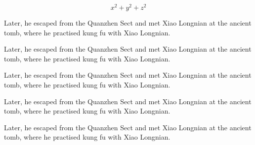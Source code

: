 \documentclass[doctor, vlined, ]{DissertUESTC}
\begin{document}
\begin{longtable}{p{2em} p{6em}}
	\end{longtable}
	

	\begin{equation}
		x^2 + y^2 + z^2
	\end{equation}
	


	\begin{Definition}[Name]
		Later, he escaped from the Quanzhen Sect and met Xiao Longnian at the ancient tomb, where he practised kung fu with Xiao Longnian.
	\end{Definition}

	\begin{Axiom}[Name]
		Later, he escaped from the Quanzhen Sect and met Xiao Longnian at the ancient tomb, where he practised kung fu with Xiao Longnian.
	\end{Axiom}
	
	\begin{Theorem}[Name]
		Later, he escaped from the Quanzhen Sect and met Xiao Longnian at the ancient tomb, where he practised kung fu with Xiao Longnian.
	\end{Theorem}
	
	\begin{Proposition}[Name]
		Later, he escaped from the Quanzhen Sect and met Xiao Longnian at the ancient tomb, where he practised kung fu with Xiao Longnian.
	\end{Proposition}
	
	\begin{Corollary}[Name]
		Later, he escaped from the Quanzhen Sect and met Xiao Longnian at the ancient tomb, where he practised kung fu with Xiao Longnian.
	\end{Corollary}
	
\end{document}
